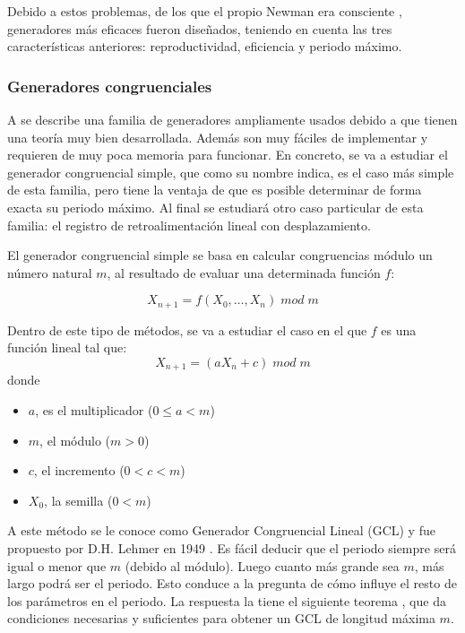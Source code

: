 Debido a estos problemas, de los que el propio Newman era consciente \cite{metropolisbeginning}, generadores más eficaces fueron diseñados, teniendo en cuenta las tres características anteriores: reproductividad, eficiencia y periodo máximo.

\subsubsection{Generadores congruenciales}

A se describe una familia de generadores ampliamente usados debido a que tienen una teoría muy bien desarrollada. Además son muy fáciles de implementar y requieren de muy poca memoria para funcionar. En concreto, se va a estudiar el generador congruencial simple, que como su nombre indica, es el caso más simple de esta familia, pero tiene la ventaja de que es posible determinar de forma exacta su periodo máximo. Al final se estudiará otro caso particular de esta familia: el registro de retroalimentación lineal con desplazamiento.

El generador congruencial simple se basa en calcular congruencias módulo un número natural $m$, al resultado de evaluar una determinada función $f$:

\begin{equation}\label{gc}
X_{n+1}=f(X_0,\ldots, X_n)\;mod\;m
\end{equation}

Dentro de este tipo de métodos, se va a estudiar el caso en el que $f$ es una función lineal tal que:
\begin{equation}\label{gcl}
X_{n+1}=(aX_n+c)\;mod\;m	
\end{equation}
donde 
\begin{itemize}
\item $a$, es el multiplicador ($0\leq a<m$)
\item $m$, el módulo ($m>0$)
\item $c$, el incremento ($0< c < m$)
\item $X_0$, la semilla ($0 < m$)
\end{itemize}

A este método se le conoce como Generador Congruencial Lineal (GCL) y fue propuesto por D.H. Lehmer en 1949 \cite{lehmer1951}. Es fácil deducir que el periodo siempre será igual o menor que $m$ (debido al módulo). Luego cuanto más grande sea $m$, más largo podrá ser el periodo. Esto conduce a la pregunta de cómo influye el resto de los parámetros en el periodo. La respuesta la tiene el siguiente teorema \cite{hull1962random}, que da condiciones necesarias y suficientes para obtener un GCL de longitud máxima $m$.

